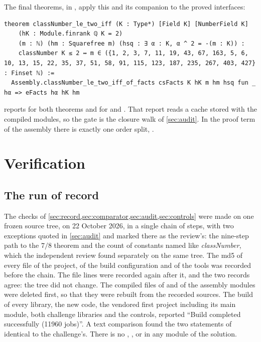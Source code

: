\documentclass[11pt]{article}
\theoremstyle{definition}
\begin{document}
{\noindent The final theorems, in , apply this and its companion  to the proved interfaces:
\begin{lstlisting}
theorem classNumber_le_two_iff (K : Type*) [Field K] [NumberField K]
    (hK : Module.finrank ℚ K = 2)
    (m : ℕ) (hm : Squarefree m) (hsq : ∃ α : K, α ^ 2 = -(m : K)) :
    classNumber K ≤ 2 ↔ m ∈ ({1, 2, 3, 7, 11, 19, 43, 67, 163, 5, 6, 10, 13, 15, 22, 35, 37, 51, 58, 91, 115, 123, 187, 235, 267, 403, 427} : Finset ℕ) :=
  Assembly.classNumber_le_two_iff_of_facts csFacts K hK m hm hsq fun _ hα => eFacts hα hK hm
\end{lstlisting}
 reports  for both theorems and for  and . That report reads a cache stored with the compiled modules, so the gate is the closure walk of \cref{sec:audit}. In the proof term of the assembly there is exactly one order split, .

\section{Verification}\label{sec:verification}

\subsection{The run of record}\label{sec:record}

The checks of \cref{sec:record,sec:comparator,sec:audit,sec:controls} were made on one frozen source tree, on 22 October 2026, in a single chain of steps, with two exceptions quoted in \cref{sec:audit} and marked there as the review's: the nine-step path to the $7/8$ theorem and the count of constants named like \emph{classNumber}, which the independent review found separately on the same tree. The md5 of every  file of the project, of the build configuration and of the tools was recorded before the chain. The file lines were recorded again after it, and the two records agree: the tree did not change. The compiled files of  and of the assembly modules were deleted first, so that they were rebuilt from the recorded sources. The build of every library, the new code, the vendored first project including its main module, both challenge libraries and the controls, reported ``Build completed successfully (11960 jobs)''. A text comparison found the two statements of  identical to the challenge's. There is no , ,  or  in any module of the solution.

}
\end{document}
